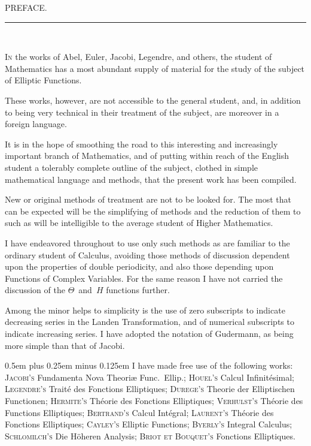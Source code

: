 \documentclass[12pt,leqno]{book}[2005/09/16]
\newcommand{\Eta}{H}
\newcommand{\First}[1]{\textsc{#1}}
\newcommand{\tb}{\rule{1in}{0.5pt}}
\newcommand{\stretchyspace}{\spaceskip0.5em plus 0.25em minus 0.125em}
\begin{document}
\clearpage


\begin{center}
{\Large PREFACE.}\\[8pt]
\tb\\[16pt]
\end{center}
{}

\First{In} the works of Abel, Euler, Jacobi, Legendre, and others,
the student of Mathematics has a most abundant supply of
material for the study of the subject of Elliptic Functions.

These works, however, are not accessible to the general
student, and, in addition to being very technical in their treatment
of the subject, are moreover in a foreign language.

It is in the hope of smoothing the road to this interesting
and increasingly important branch of Mathematics, and of
putting within reach of the English student a tolerably complete
outline of the subject, clothed in simple mathematical
language and methods, that the present work has been compiled.

New or original methods of treatment are not to be looked
for. The most that can be expected will be the simplifying of
methods and the reduction of them to such as will be intelligible
to the average student of Higher Mathematics.

I have endeavored throughout to use only such methods as
are familiar to the ordinary student of Calculus, avoiding those
methods of discussion dependent upon the properties of double
periodicity, and also those depending upon Functions of Complex
Variables. For the same reason I have not carried the
discussion of the $\Theta$~and~$\Eta$ functions further.

Among the minor helps to simplicity is the use of zero
subscripts to indicate decreasing series in the Landen Transformation,
and of numerical subscripts to indicate increasing
series. I have adopted the notation of Gudermann, as being
more simple than that of Jacobi.

{\stretchyspace
I have made free use of the following works: \textsc{Jacobi's}
Fundamenta Nova Theoriæ Func.\ Ellip.; \textsc{Houel's} Calcul
Infinitésimal; \textsc{Legendre's} Traité des Fonctions Elliptiques;
\textsc{Durege's} Theorie der Elliptischen Functionen; \textsc{Hermite's}
Théorie des Fonctions Elliptiques; \textsc{Verhulst's} Théorie des
Functions Elliptiques; \textsc{Bertrand's} Calcul Intégral; \textsc{Laurent's}
Théorie des Fonctions Elliptiques; \textsc{Cayley's} Elliptic
Functions; \textsc{Byerly's} Integral Calculus; \textsc{Schlomilch's} Die
Höheren Analysis; \textsc{Briot et Bouquet's} Fonctions Elliptiques.}
\end{document}
